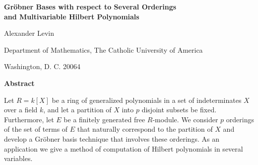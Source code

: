 \documentclass[10pt]{article}
\begin{document}
\begin{center}

{\bf Gr\"obner Bases with respect to Several Orderings\\
and Multivariable Hilbert Polynomials}

Alexander Levin 

Department of Mathematics, The Catholic University
of America

Washington, D. C. 20064


\bigskip

{\bf Abstract}

\end{center}

Let $R = k[X]$ be a ring of generalized polynomials in a set of 
indeterminates $X$ over a field $k$, and let a partition of $X$ into 
$p$ disjoint subsets be fixed. Furthermore, let $E$ be a finitely 
generated free $R$-module. We consider $p$ orderings of the set of 
terms of $E$ that naturally correspond to the partition of $X$ and 
develop a Gr\"obner basis technique that involves these orderings. 
As an application we give a method of computation of 
Hilbert polynomials in several variables.
\end{document}
